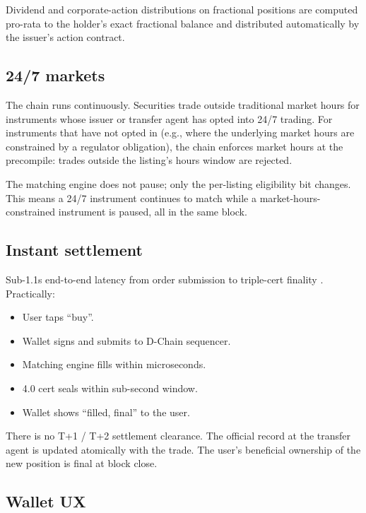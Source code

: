 Dividend and corporate-action distributions on fractional positions
are computed pro-rata to the holder's exact fractional balance and
distributed automatically by the issuer's action contract.

\subsection{24/7 markets}

The chain runs continuously. Securities trade outside traditional
market hours for instruments whose issuer or transfer agent has
opted into 24/7 trading. For instruments that have not opted in
(e.g., where the underlying market hours are constrained by a
regulator obligation), the chain enforces market hours at the
\Liquidity{} precompile: trades outside the listing's hours window
are rejected.

The matching engine does not pause; only the per-listing eligibility
bit changes. This means a 24/7 instrument continues to match while
a market-hours-constrained instrument is paused, all in the same
block.

\subsection{Instant settlement}

Sub-1.1s end-to-end latency from order submission to triple-cert
finality \cite{lp-020}. Practically:

\begin{itemize}[leftmargin=1.2em]
  \item User taps ``buy''.
  \item Wallet signs and submits to D-Chain sequencer.
  \item Matching engine fills within microseconds.
  \item \Quasar{} 4.0 cert seals within sub-second window.
  \item Wallet shows ``filled, final'' to the user.
\end{itemize}

There is no T+1 / T+2 settlement clearance. The official record at
the transfer agent is updated atomically with the trade. The user's
beneficial ownership of the new position is final at block close.

\subsection{Wallet UX}


